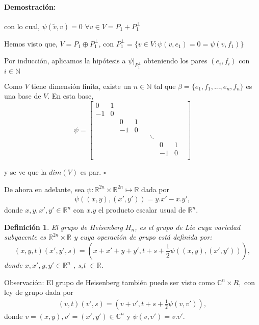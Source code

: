 \documentclass[12pt]{article}
\newtheorem{definition}{Definición}
\newenvironment{proof}{\paragraph{Demostración:}}{\hfill$\square$}
\begin{document}
\begin{proof}
 con lo cual, $\psi(\tilde{v},v)=0$ $\forall v \in V=P_1 + P_1^{\bot}$
 
 
Hemos visto que, $V=P_1 \oplus P_1^{\bot}$, con $P_1^{\bot}=\{v \in V : \psi(v,e_1)=0=\psi(v,f_1)\}$

Por inducción, aplicamos la hipótesis a $\psi|_{P_1^{\bot}}$ obteniendo los pares $(e_i,f_i)$ con $i \in \mathbb{N}$

Como $V$ tiene dimensión finita, existe un $n \in \mathbb{N}$ tal que  $\beta=\{e_1,f_1,...,e_n,f_n\}$ es una base de $V$.
En esta base, 
$$\psi = 
\begin{bmatrix}
 0 & 1 & & & & & & &\\ 
 -1& 0 & & & & & & &\\
 & & 0 & 1 & & & & &\\
 & & -1 & 0 & & & & &\\
 & &  &  & & \ddots & & &\\
 & &  &  & & & 0 & 1 &\\
 & &  &  & & & -1 & 0 &\\ 
\end{bmatrix}
$$

y se ve que la $dim(V)$ es par. 
\end{proof}
\newline


De ahora en adelante, sea $\psi :\mathbb{R}^{2n} \times \mathbb{R}^{2n}\mapsto \mathbb{R}$ dada por 
$$ \begin{aligned}
\psi((x,y),(x',y'))=y.x'-x.y' ,
\end{aligned}$$
donde $x,y,x',y' \in \mathbb{R}^n$ con  $x.y$ el producto escalar usual de $\mathbb{R}^n$.

\begin{definition}
 El grupo de Heisenberg $H_n$, es el grupo de Lie cuya variedad subyacente es $\mathbb{R}^{2n} \times \mathbb{R}$ y 
 cuya operación de grupo está definida por: 
 $$(x,y,t)(x',y',s)=(x+x'+y+y',t+s + \frac{1}{2} \psi((x,y),(x',y'))),$$
 donde $x,x',y,y' \in \mathbb{R}^{n}$ , s,t $\in \mathbb{R}$.
\end{definition}



Observación:
El grupo de Heisenberg también puede ser visto como  $\mathbb{C}^{n}\times R,$ con
ley de grupo dada por 
$$\begin{aligned}
(v,t)(v',s)=(v+v',t+s+ \frac{1}{2} \psi(v,v')),
\end{aligned}$$
donde $v=(x,y),v'=(x',y') \in \mathbb{C}^n$ y $\psi (v,v')=v.\overline{v'}.$
\end{document}
